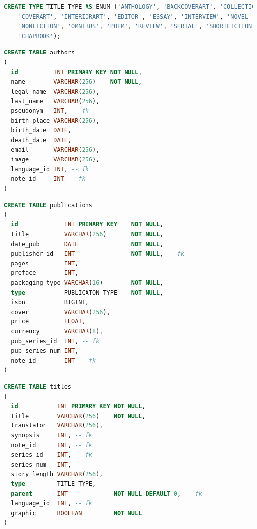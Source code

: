 \documentclass[doubleside, titlepage]{article}
\begin{document}
\begin{lstlisting}[language=SQL,showspaces=false,basicstyle=\ttfamily,numberstyle=\tiny,commentstyle=\color{gray}
        ]
CREATE TYPE TITLE_TYPE AS ENUM ('ANTHOLOGY', 'BACKCOVERART', 'COLLECTION',
	'COVERART', 'INTERIORART', 'EDITOR', 'ESSAY', 'INTERVIEW', 'NOVEL',
	'NONFICTION', 'OMNIBUS', 'POEM', 'REVIEW', 'SERIAL', 'SHORTFICTION',
	'CHAPBOOK');
\end{lstlisting}

\begin{lstlisting}[language=SQL,showspaces=false,basicstyle=\ttfamily,numberstyle=\tiny,commentstyle=\color{gray}
        ]
CREATE TABLE authors
(
  id          INT PRIMARY KEY NOT NULL,
  name        VARCHAR(256)    NOT NULL,
  legal_name  VARCHAR(256),
  last_name   VARCHAR(256),
  pseudonym   INT, -- fk
  birth_place VARCHAR(256),
  birth_date  DATE,
  death_date  DATE,
  email       VARCHAR(256),
  image       VARCHAR(256),
  language_id INT, -- fk
  note_id     INT -- fk
)
\end{lstlisting}

\begin{lstlisting}[language=SQL,showspaces=false,basicstyle=\ttfamily,numberstyle=\tiny,commentstyle=\color{gray}
        ]
CREATE TABLE publications
(
  id             INT PRIMARY KEY 	NOT NULL,
  title          VARCHAR(256)    	NOT NULL,
  date_pub       DATE            	NOT NULL,
  publisher_id   INT             	NOT NULL, -- fk
  pages          INT,
  preface        INT,
  packaging_type VARCHAR(16)   		NOT NULL,
  type           PUBLICATON_TYPE    NOT NULL,
  isbn           BIGINT,
  cover          VARCHAR(256),
  price          FLOAT,
  currency       VARCHAR(8),
  pub_series_id  INT, -- fk
  pub_series_num INT,
  note_id        INT -- fk
)
\end{lstlisting}

\newpage

\begin{lstlisting}[language=SQL,showspaces=false,basicstyle=\ttfamily,numberstyle=\tiny,commentstyle=\color{gray}
        ]
CREATE TABLE titles
(
  id           INT PRIMARY KEY NOT NULL,
  title        VARCHAR(256)    NOT NULL,
  translator   VARCHAR(256),
  synopsis     INT, -- fk
  note_id      INT, -- fk
  series_id    INT, -- fk
  series_num   INT,
  story_length VARCHAR(256),
  type         TITLE_TYPE,
  parent       INT             NOT NULL DEFAULT 0, -- fk
  language_id  INT, -- fk
  graphic      BOOLEAN         NOT NULL
)
\end{lstlisting}
\end{document}

